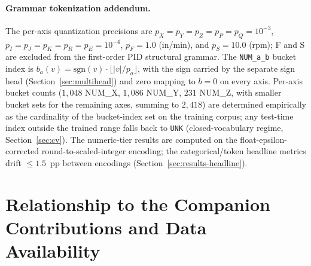 \documentclass[sensors,article,submit,moreauthors,pdftex]{Definitions/mdpi}
\begin{document}
\paragraph{Grammar tokenization addendum.} The per-axis quantization precisions are $p_X\!=\!p_Y\!=\!p_Z\!=\!p_P\!=\!p_Q\!=\!10^{-3}$, $p_I\!=\!p_J\!=\!p_K\!=\!p_R\!=\!p_E\!=\!10^{-4}$, $p_F\!=\!1.0$ (in/min), and $p_S\!=\!10.0$ (rpm); F and S are excluded from the first-order PID structural grammar. The \texttt{NUM\_a\_b} bucket index is $b_a(v) = \mathrm{sgn}(v)\cdot\lfloor |v|/p_a \rfloor$, with the sign carried by the separate sign head (Section~\ref{sec:multihead}) and zero mapping to $b\!=\!0$ on every axis. Per-axis bucket counts ($1{,}048$ NUM\_X, $1{,}086$ NUM\_Y, $231$ NUM\_Z, with smaller bucket sets for the remaining axes, summing to $2{,}418$) are determined empirically as the cardinality of the bucket-index set on the training corpus; any test-time index outside the trained range falls back to \texttt{UNK} (closed-vocabulary regime, Section~\ref{sec:cv}). The numeric-tier results are computed on the float-epsilon-corrected round-to-scaled-integer encoding; the categorical/token headline metrics drift $\le\!1.5$~pp between encodings (Section~\ref{sec:results-headline}).


\section{Relationship to the Companion Contributions and Data Availability}
\label{app:companion}
\end{document}
